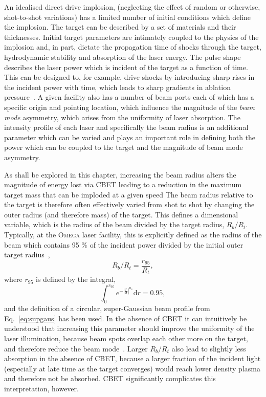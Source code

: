 An idealised direct drive implosion, (neglecting the effect of random or otherwise, shot-to-shot variations) has a limited number of initial conditions which define the implosion.
The target can be described by a set of materials and their thicknesses.
Initial target parameters are intimately coupled to the physics of the implosion and, in part, dictate the propagation time of shocks through the target, hydrodynamic stability and absorption of the laser energy.
The pulse shape describes the laser power which is incident of the target as a function of time.
This can be designed to, for example, drive shocks by introducing sharp rises in the incident power with time, which leads to sharp gradients in ablation pressure~\cite{scott_shock-augmented_2022}.
A given facility also has a number of beam ports each of which has a specific origin and pointing location, which influence the magnitude of the \textit{beam mode} asymmetry, which arises from the uniformity of laser absorption.
The intensity profile of each laser and specifically the beam radius is an additional parameter which can be varied and plays an important role in defining both the power which can be coupled to the target and the magnitude of beam mode asymmetry.

As shall be explored in this chapter, increasing the beam radius alters the magnitude of energy lost via \ac{CBET} leading to a reduction in the maximum target mass that can be imploded at a given speed
The beam radius relative to the target is therefore often effectively varied from shot to shot by changing the outer radius (and therefore mass) of the target.
This defines a dimensional variable, which is the radius of the beam divided by the target radius, $R_b/R_t$.
Typically, at the \textsc{Omega} laser facility, this is explicitly defined as the radius of the beam which contains 95 \% of the incident power divided by the initial outer target radius~\cite{froula_increasing_2012,colaitis_exploration_2023,anderson_enhanced_2024},
\begin{equation}
    R_b/R_t = \frac{r_{95}}{R_t},
\end{equation}
where $r_{95}$ is defined by the integral,
\begin{equation}
    \int_0^{r_{95}}e^{- \left| \frac{r}{\sigma} \right| ^{n_s}}\text{d}r = 0.95,
\end{equation}
and the definition of a circular, super-Gaussian beam profile from Eq.~\ref{eq:supgaus} has been used.
In the absence of \ac{CBET} it can intuitively be understood that increasing this parameter should improve the uniformity of the laser illumination, because beam spots overlap each other more on the target, and therefore reduce the beam mode~\cite{lees_understanding_2023}.
Larger $R_b/R_t$ also lead to slightly less absorption in the absence of \ac{CBET}, because a larger fraction of the incident light (especially at late time as the target converges) would reach lower density plasma and therefore not be absorbed.
\ac{CBET} significantly complicates this interpretation, however.


